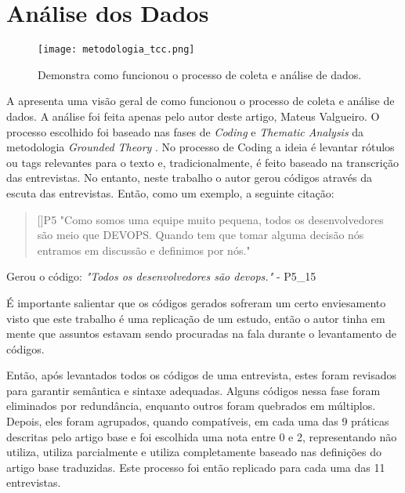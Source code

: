 \section{Análise dos Dados}

\begin{figure}[ht]
\begin{center}
\texttt{[image: metodologia\_tcc.png]}
\end{center}
\caption[Fluxograma da Metodologia]{
    Demonstra como funcionou o processo de coleta e análise de dados.
}\label{fluxograma_metodologia}
\end{figure}

    
A  apresenta uma visão geral de como funcionou o processo de coleta e análise de dados. A análise foi feita apenas pelo autor deste artigo, Mateus Valgueiro. O processo escolhido foi baseado nas fases de \emph{Coding} e \emph{Thematic Analysis} da metodologia \emph{Grounded Theory} \cite{groundedTheory}. No processo de Coding a ideia é levantar rótulos ou tags relevantes para o texto e, tradicionalmente, é feito baseado na transcrição das entrevistas. No entanto, neste trabalho o autor gerou códigos através da escuta das entrevistas. Então, como um exemplo, a seguinte citação:

\begin{quotation}[]{P5}
"Como somos uma equipe muito pequena, todos os desenvolvedores são meio que DEVOPS. Quando tem que tomar alguma decisão nós entramos em discussão e definimos por nós."
\end{quotation}

Gerou o código: \emph{"Todos os desenvolvedores são devops."} - P5\_15

É importante salientar que os códigos gerados sofreram um certo enviesamento visto que este trabalho é uma replicação de um estudo, então o autor tinha em mente que assuntos estavam sendo procuradas na fala durante o levantamento de códigos. 

Então, após levantados todos os códigos de uma entrevista, estes foram revisados para garantir semântica e sintaxe adequadas. Alguns códigos nessa fase foram eliminados por redundância, enquanto outros foram quebrados em múltiplos. Depois, eles foram agrupados, quando compatíveis, em cada uma das 9 práticas descritas pelo artigo base e foi escolhida uma nota entre 0 e 2, representando não utiliza, utiliza parcialmente e utiliza completamente baseado nas definições do artigo base traduzidas. Este processo foi então replicado para cada uma das 11 entrevistas.

